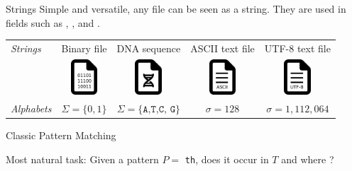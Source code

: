 \begin{frame}{Strings}
    Simple and versatile, any file can be seen as a string.
    They are used in fields such as , , and .

    \medskip
    \begin{tabular}{l  c c c c}
        \emph{Strings} & Binary file & DNA sequence & ASCII text file & UTF-8 text file \\
        \rule{0pt}{10ex}    
        &
        \includegraphics[width=1cm]{pictures/file-bin.png}&
        \includegraphics[width=1cm]{pictures/file-dna.png}&
        \includegraphics[width=1cm]{pictures/file-ascii.png}&
        \includegraphics[width=1cm]{pictures/file-utf-8.png}
        \\
        \rule{0pt}{4ex}  
        \emph{Alphabets} & $\Sigma=\{0,1\}$ & $\Sigma=\{\texttt{A,T,C, G}\}$ & $\sigma=128$ & $\sigma = 1,112,064$\\
    \end{tabular}
    \medskip


\end{frame}


\begin{frame}{Classic Pattern Matching}

    Most natural task: Given a pattern $P =$ \texttt{th}, does it occur in  $T$ and where ?

    \begin{center}
        \\
    \end{center}
\end{frame}

